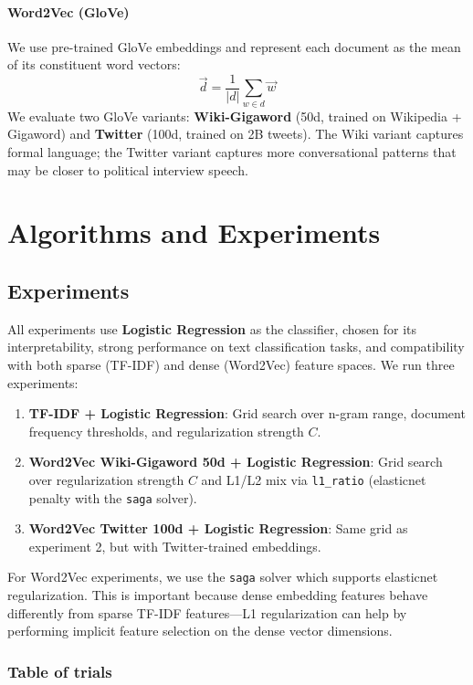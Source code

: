 \documentclass[12pt]{fphw}
\begin{document}
\paragraph{Word2Vec (GloVe)} We use pre-trained GloVe embeddings \cite{glove} and represent each document as the mean of its constituent word vectors:
$$
\vec{d} = \frac{1}{|d|} \sum_{w \in d} \vec{w}
$$
We evaluate two GloVe variants: \textbf{Wiki-Gigaword} (50d, trained on Wikipedia + Gigaword) and \textbf{Twitter} (100d, trained on 2B tweets). The Wiki variant captures formal language; the Twitter variant captures more conversational patterns that may be closer to political interview speech.


\section{Algorithms and Experiments}

\subsection{Experiments}

All experiments use \textbf{Logistic Regression} as the classifier, chosen for its interpretability, strong performance on text classification tasks, and compatibility with both sparse (TF-IDF) and dense (Word2Vec) feature spaces. We run three experiments:

\begin{enumerate}
	\item \textbf{TF-IDF + Logistic Regression}: Grid search over n-gram range, document frequency thresholds, and regularization strength $C$.
	\item \textbf{Word2Vec Wiki-Gigaword 50d + Logistic Regression}: Grid search over regularization strength $C$ and L1/L2 mix via \texttt{l1\_ratio} (elasticnet penalty with the \texttt{saga} solver).
	\item \textbf{Word2Vec Twitter 100d + Logistic Regression}: Same grid as experiment 2, but with Twitter-trained embeddings.
\end{enumerate}

For Word2Vec experiments, we use the \texttt{saga} solver which supports elasticnet regularization. This is important because dense embedding features behave differently from sparse TF-IDF features---L1 regularization can help by performing implicit feature selection on the dense vector dimensions.

\subsubsection{Table of trials}
\end{document}
